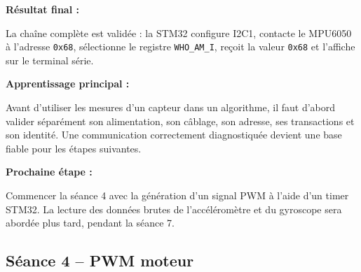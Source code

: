 \documentclass[11pt,a4paper]{article}
\begin{document}
\begin{sessionbox}
		\vspace{0.3cm}
		
		\textbf{Résultat final :}
		
		La chaîne complète est validée : la STM32 configure I2C1, contacte le MPU6050 à l'adresse \texttt{0x68}, sélectionne le registre \texttt{WHO\_AM\_I}, reçoit la valeur \texttt{0x68} et l'affiche sur le terminal série.
		
		\begin{center}
		\end{center}
		
		\vspace{0.3cm}
		
		\textbf{Apprentissage principal :}
		
		Avant d'utiliser les mesures d'un capteur dans un algorithme, il faut d'abord valider séparément son alimentation, son câblage, son adresse, ses transactions et son identité. Une communication correctement diagnostiquée devient une base fiable pour les étapes suivantes.
		
		\vspace{0.3cm}
		
		\textbf{Prochaine étape :}
		
		Commencer la séance 4 avec la génération d'un signal PWM à l'aide d'un timer STM32. La lecture des données brutes de l'accéléromètre et du gyroscope sera abordée plus tard, pendant la séance 7.
		
	\end{sessionbox}
	
	\subsection*{Séance 4 -- PWM moteur}
	
\end{document}
